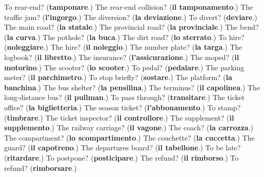 \begin{tcolorbox}[breakable,colback=teal!4,colframe=teal!35!black,title={Before you move on}]
To rear-end? (\textbf{tamponare}.) The rear-end collision? (\textbf{il tamponamento}.) The traffic jam? (\textbf{l'ingorgo}.) The diversion? (\textbf{la deviazione}.) To divert? (\textbf{deviare}.) The main road? (\textbf{la statale}.) The provincial road? (\textbf{la provinciale}.) The bend? (\textbf{la curva}.) The pothole? (\textbf{la buca}.) The dirt road? (\textbf{lo sterrato}.) To hire? (\textbf{noleggiare}.) The hire? (\textbf{il noleggio}.) The number plate? (\textbf{la targa}.) The logbook? (\textbf{il libretto}.) The insurance? (\textbf{l'assicurazione}.) The moped? (\textbf{il motorino}.) The scooter? (\textbf{lo scooter}.) To pedal? (\textbf{pedalare}.) The parking meter? (\textbf{il parchimetro}.) To stop briefly? (\textbf{sostare}.) The platform? (\textbf{la banchina}.) The bus shelter? (\textbf{la pensilina}.) The terminus? (\textbf{il capolinea}.) The long-distance bus? (\textbf{il pullman}.) To pass through? (\textbf{transitare}.) The ticket office? (\textbf{la biglietteria}.) The season ticket? (\textbf{l'abbonamento}.) To stamp? (\textbf{timbrare}.) The ticket inspector? (\textbf{il controllore}.) The supplement? (\textbf{il supplemento}.) The railway carriage? (\textbf{il vagone}.) The coach? (\textbf{la carrozza}.) The compartment? (\textbf{lo scompartimento}.) The couchette? (\textbf{la cuccetta}.) The guard? (\textbf{il capotreno}.) The departures board? (\textbf{il tabellone}.) To be late? (\textbf{ritardare}.) To postpone? (\textbf{posticipare}.) The refund? (\textbf{il rimborso}.) To refund? (\textbf{rimborsare}.)
\end{tcolorbox}
